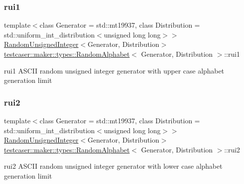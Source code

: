 \subsubsection{\texorpdfstring{rui1}{rui1}}
{\footnotesize\ttfamily template$<$class Generator = std\+::mt19937, class Distribution = std\+::uniform\+\_\+int\+\_\+distribution$<$unsigned long long$>$$>$ \\
\mbox{\hyperlink{classtestcaser_1_1maker_1_1types_1_1RandomUnsignedInteger}{Random\+Unsigned\+Integer}}$<$Generator, Distribution$>$ \mbox{\hyperlink{structtestcaser_1_1maker_1_1types_1_1RandomAlphabet}{testcaser\+::maker\+::types\+::\+Random\+Alphabet}}$<$ Generator, Distribution $>$\+::rui1}



rui1 A\+S\+C\+II random unsigned integer generator with upper case alphabet generation limit 

\mbox{\label{structtestcaser_1_1maker_1_1types_1_1RandomAlphabet_aa59de4bce4077e7075f5cac015233643}} 
\subsubsection{\texorpdfstring{rui2}{rui2}}
{\footnotesize\ttfamily template$<$class Generator = std\+::mt19937, class Distribution = std\+::uniform\+\_\+int\+\_\+distribution$<$unsigned long long$>$$>$ \\
\mbox{\hyperlink{classtestcaser_1_1maker_1_1types_1_1RandomUnsignedInteger}{Random\+Unsigned\+Integer}}$<$Generator, Distribution$>$ \mbox{\hyperlink{structtestcaser_1_1maker_1_1types_1_1RandomAlphabet}{testcaser\+::maker\+::types\+::\+Random\+Alphabet}}$<$ Generator, Distribution $>$\+::rui2}



rui2 A\+S\+C\+II random unsigned integer generator with lower case alphabet generation limit 

\mbox{\label{structtestcaser_1_1maker_1_1types_1_1RandomAlphabet_a4840472bf48a5fb87c61d27d96fe47e1}} 
